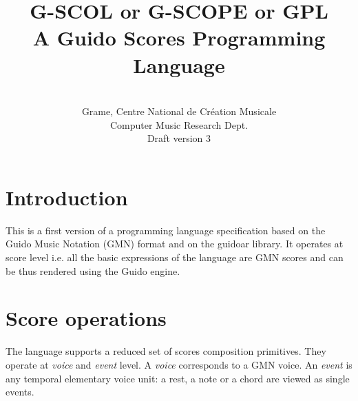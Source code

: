 \documentclass[10pt,a4paper,frenchb]{article}
\begin{document}
\title{\textbf{\textsc{G-SCOL}} or \textbf{\textsc{G-SCOPE}} or \textbf{\textsc{GPL}} \\
A Guido Scores Programming Language}


\author{
\\
Grame, Centre National de Création Musicale \\
Computer Music Research Dept.\\
Draft version 3 
}

\maketitle

\section{Introduction}

This is a first version of a programming language specification based on the Guido Music Notation (GMN) format and on the guidoar library. It operates at score level i.e. all the basic expressions of the language are GMN scores and can be thus rendered using the Guido engine. 


\section{Score operations}

The language supports a reduced set of scores composition primitives.
They operate at \emph{voice} and \emph{event} level. 
A \emph{voice} corresponds to a GMN voice.
An \emph{event} is any temporal elementary voice unit: a rest, a note or a chord are viewed as single events.
\end{document}
